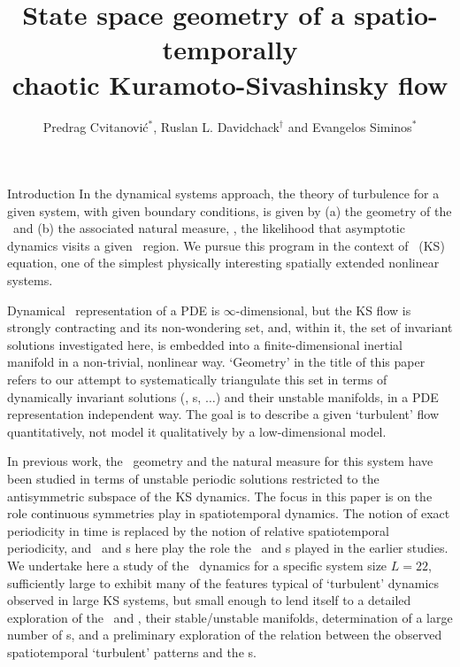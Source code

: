 \documentclass{theo1poster}[2003/04/25]
\title{State space geometry of a spatio-temporally\\ chaotic
Kuramoto-Sivashinsky flow}
\author{Predrag Cvitanovi\'c\ensuremath{^*}, Ruslan L. Davidchack\ensuremath{^\dagger} and Evangelos Siminos\ensuremath{^*}}
\begin{document}
\begin{poster}{3}

\small

\begin{sheet}{Introduction}
In the dynamical systems approach, the
theory of turbulence for a given system, with given boundary conditions,
is given by (a) the geometry of the \statesp\ and (b) the associated natural measure,
\ie, the likelihood that asymptotic dynamics visits a given \statesp\ region.
We pursue this program in the context of \KS\ (KS) equation,
one of the simplest physically interesting spatially extended
nonlinear systems.

Dynamical \statesp\ representation of a PDE is $\infty$-dimensional,
but the KS flow is strongly contracting and its non-wondering set,
and, within it, the set of invariant solutions investigated here, is
embedded into a finite-dimensional inertial manifold in
a non-trivial, nonlinear way. `Geometry' in the title of this paper
refers to our attempt to systematically triangulate this set in
terms of dynamically invariant solutions (\eqva, \po s, $\ldots$)
and their unstable manifolds, in a PDE representation 
independent way. The goal is to describe a given
`turbulent' flow quantitatively, not model it qualitatively by a
low-dimensional model.

In previous work, the \statesp\ geometry and the natural measure for
this system have been
studied in terms of unstable
periodic solutions restricted to the antisymmetric subspace of the
KS dynamics. The focus in this paper is on the role continuous symmetries play in
spatiotemporal dynamics.
The notion of exact periodicity in time is
replaced by the notion of relative spatiotemporal
periodicity, and \reqva\ and \rpo s here play the role the \eqva\
and \po s played in the earlier studies.  We undertake here
a study of the \KS\ dynamics for a specific system size $L = 22$, sufficiently large
to exhibit many of the features typical of `turbulent' dynamics
observed in large KS systems, but small enough to lend itself to a
detailed exploration of the  \eqva\ and \reqva,
their stable/unstable manifolds,
determination of a large number of
\rpo s, and a preliminary exploration of the relation between the
observed spatiotemporal `turbulent' patterns and the \rpo s.

\end{sheet}


\begin{sheet}{\KSe}


\end{sheet}
\end{poster}
\end{document}
